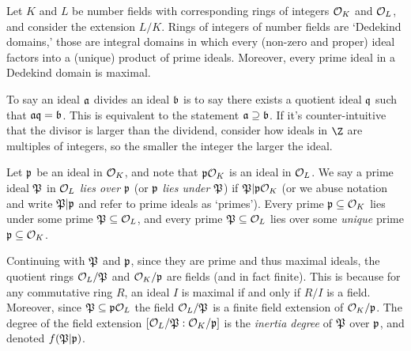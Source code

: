 Let $K$ and $L$ be number fields with corresponding rings of integers $\mathcal{O}_K$ and $\mathcal{O}_L$, and consider the extension $L/K$.
Rings of integers of number fields are `Dedekind domains,' those are integral domains in which every (non-zero and proper) ideal factors into a (unique) product of prime ideals.
Moreover, every prime ideal in a Dedekind domain is maximal.
\begin{note}
    To say an ideal $\mathfrak{a}$ divides an ideal $\mathfrak{b}$ is to say there exists a quotient ideal $\mathfrak{q}$ such that $\mathfrak{a}\mathfrak{q}=\mathfrak{b}$.
    This is equivalent to the statement $\mathfrak{a}\supseteq\mathfrak{b}$.
    If it's counter-intuitive that the divisor is larger than the dividend, consider how ideals in $\Z$ are multiples of integers, so the smaller the integer the larger the ideal.
\end{note}

Let $\mathfrak{p}$ be an ideal in $\mathcal{O}_K$, and note that $\mathfrak{p}\mathcal{O}_K$ is an ideal in $\mathcal{O}_L$.
We say a prime ideal $\mathfrak{P}$ in $\mathcal{O}_L$ \emph{lies over} $\mathfrak{p}$ (or $\mathfrak{p}$ \emph{lies under} $\mathfrak{P}$) if $\mathfrak{P}|\mathfrak{p}\mathcal{O}_K$ (or we abuse notation and write $\mathfrak{P}|\mathfrak{p}$ and refer to prime ideals as `primes').
Every prime $\mathfrak{p}\subseteq\mathcal{O}_K$ lies under some prime $\mathfrak{P}\subseteq\mathcal{O}_L$, and every prime $\mathfrak{P}\subseteq\mathcal{O}_L$ lies over some \emph{unique} prime $\mathfrak{p}\subseteq\mathcal{O}_K$.

Continuing with $\mathfrak{P}$ and $\mathfrak{p}$, since they are prime and thus maximal ideals, the quotient rings $\mathcal{O}_L/\mathfrak{P}$ and $\mathcal{O}_K/\mathfrak{p}$ are fields (and in fact finite).
This is because for any commutative ring $R$, an ideal $I$ is maximal if and only if $R/I$ is a field.
Moreover, since $\mathfrak{P}\subseteq\mathfrak{p}\mathcal{O}_L$ the field $\mathcal{O}_L/\mathfrak{P}$ is a finite field extension of $\mathcal{O}_K/\mathfrak{p}$.
The degree of the field extension $[\mathcal{O}_L/\mathfrak{P}:\mathcal{O}_K/\mathfrak{p}]$ is the \emph{inertia degree} of $\mathfrak{P}$ over $\mathfrak{p}$, and denoted $f(\mathfrak{P}|\mathfrak{p})$.

